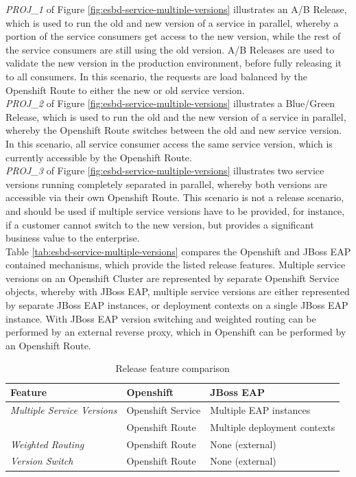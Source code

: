 \emph{PROJ\_1} of Figure \vref{fig:esbd-service-multiple-versions} illustrates an A/B Release, which is used to run the old and new version of a service in parallel, whereby a portion of the service consumers get access to the new version, while the rest of the service consumers are still using the old version. A/B Releases are used to validate the new version in the production environment, before fully releasing it to all consumers. In this scenario, the requests are load balanced by the Openshift Route to either the new or old service version. \\ 

\emph{PROJ\_2} of Figure \vref{fig:esbd-service-multiple-versions} illustrates a Blue/Green Release, which is used to run the old and the new version of a service in parallel, whereby the Openshift Route switches between the old and new service version. In this scenario, all service consumer access the same service version, which is currently accessible by the Openshift Route. \\

\emph{PROJ\_3} of Figure \vref{fig:esbd-service-multiple-versions} illustrates two service versions running completely separated in parallel, whereby both versions are accessible via their own Openshift Route. This scenario is not a release scenario, and should be used if multiple service versions have to be provided, for instance, if a customer cannot switch to the new version, but provides a significant business value to the enterprise. \\

Table \vref{tab:esbd-service-multiple-versions} compares the Openshift and JBoss EAP contained mechanisms, which provide the listed release features. Multiple service versions on an Openshift Cluster are represented by separate Openshift Service objects, whereby with JBoss EAP, multiple service versions are either represented by separate JBoss EAP instances, or deployment contexts on a single JBoss EAP instance. With JBoss EAP version switching and weighted routing can be performed by an external reverse proxy, which in Openshift can be performed by an Openshift Route.

{\renewcommand{\arraystretch}{1.2}%
	\begin{table}[h]
		\begin{tabularx}{\textwidth}{ X|X|X }	
			\textbf{Feature}                  & \textbf{Openshift}      & \textbf{JBoss EAP} \\  \hline
			\textit{Multiple Service Versions}& Openshift Service       & Multiple EAP instances \\
											  & Openshift Route    	    & Multiple deployment contexts \\ \hline
			\textit{Weighted Routing}         & Openshift Route         & None (external) \\  \hline
			\textit{Version Switch}           & Openshift Route         & None (external) \\  \hline
		\end{tabularx}
		\caption{Release feature comparison}
		\label{tab:esbd-service-multiple-versions}
\end{table}}

